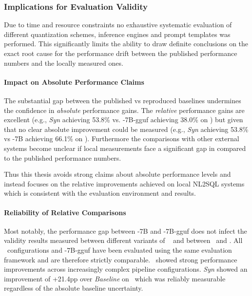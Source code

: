 \subsubsection{Implications for Evaluation Validity}

Due to time and resource constraints no exhaustive systematic evaluation of
different quantization schemes, inference engines and prompt templates
was performed. This significantly limits the ability to draw
definite conclusions on the exact root cause for the performance drift between
the published performance numbers and the locally measured ones.

\paragraph{Impact on Absolute Performance Claims}

The substantial gap between the published vs reproduced baselines undermines
the confidence in \textit{absolute} performance gains. The \textit{relative}
performance gains are excellent (e.g., \textit{Syn} achieving 53.8\% vs.
\OmniSQL-7B-gguf achieving 38.0\% on \Bird) but given that no clear absolute
improvement could be measured (e.g., \textit{Syn} achieving 53.8\% vs
\OmniSQL-7B achieving 66.1\% on \Bird). Furthermore the comparisons with other
external systems become unclear if local measurements face a significant gap in
compared to the published performance numbers.

Thus this thesis avoids strong claims about absolute performance levels and
instead focuses on the relative improvements achieved on local NL2SQL systems
which is consistent with the evaluation environment and results.

\paragraph{Reliability of Relative Comparisons}

Most notably, the performance gap between \OmniSQL-7B and \OmniSQL-7B-gguf does
not infect the validity results measured between different variants of
\Natural~ and between \Natural~and \OmniSQL. All \Natural~configurations and
\OmniSQL-7B-gguf have been evaluated using the same evaluation framework and
are therefore strictly comparable. \Natural~showed strong performance
improvements across increasingly complex pipeline configurations. \textit{Syn}
showed an improvement of +21.4pp over \textit{Baseline} on \Bird~which was
reliably measurable regardless of the absolute baseline uncertainty.

